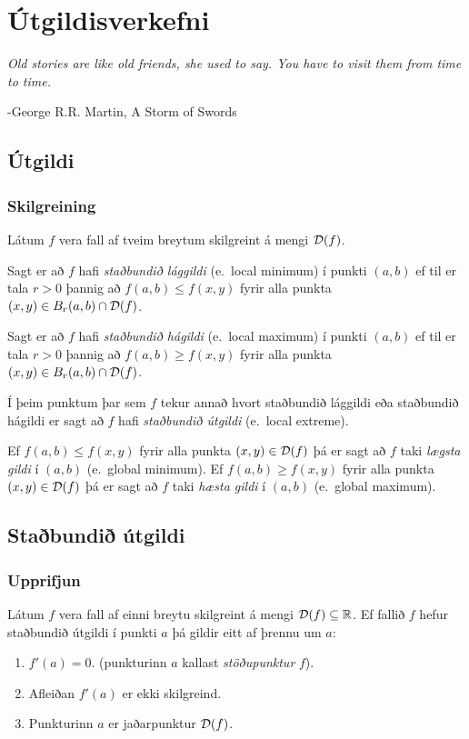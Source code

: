 \documentclass[a4paper,10pt,icelandic]{sphinxmanual}
\begin{document}
\chapter{Útgildisverkefni}
\label{Kafli3::doc}\label{Kafli3:utgildisverkefni}
\emph{Old stories are like old friends, she used to say. You have to visit them from time to time.}

-George R.R. Martin, A Storm of Swords


\section{Útgildi}
\label{Kafli3:utgildi}

\subsection{Skilgreining}
\label{Kafli3:skilgreining}
Látum \(f\) vera fall af tveim breytum skilgreint á mengi
\({\cal D}(f)\).

Sagt er að \(f\) hafi \emph{staðbundið lággildi} (e. local minimum) í
punkti \((a,b)\) ef til er tala \(r>0\) þannig að
\(f(a,b)\leq f(x,y)\) fyrir alla punkta
\((x,y)\in B_r(a,b)\cap{\cal D}(f)\).

Sagt er að \(f\) hafi \emph{staðbundið hágildi} (e. local maximum) í
punkti \((a,b)\) ef til er tala \(r>0\) þannig að
\(f(a,b)\geq f(x,y)\) fyrir alla punkta
\((x,y)\in B_r(a,b)\cap{\cal D}(f)\).

Í þeim punktum þar sem \(f\) tekur annað hvort staðbundið lággildi
eða staðbundið hágildi er sagt að \(f\) hafi \emph{staðbundið útgildi}
(e. local extreme).

Ef \(f(a,b)\leq f(x,y)\) fyrir alla punkta
\((x,y)\in {\cal D}(f)\) þá er sagt að \(f\) taki \emph{lægsta gildi}
í \((a,b)\) (e. global minimum). Ef \(f(a,b)\geq f(x,y)\) fyrir
alla punkta \((x,y)\in {\cal D}(f)\) þá er sagt að \(f\) taki
\emph{hæsta gildi} í \((a,b)\) (e. global maximum).


\section{Staðbundið útgildi}
\label{Kafli3:stabundi-utgildi}

\subsection{Upprifjun}
\label{Kafli3:upprifjun}
Látum \(f\) vera fall af einni breytu skilgreint á mengi
\({\cal D}(f)\subseteq {\mathbb  R}\). Ef fallið \(f\) hefur
staðbundið útgildi í punkti \(a\) þá gildir eitt af þrennu um
\(a\):
\begin{enumerate}
\item {} 
\(f'(a)=0\). (punkturinn \(a\) kallast \emph{stöðupunktur}
\(f\)).

\item {} 
Afleiðan \(f'(a)\) er ekki skilgreind.

\item {} 
Punkturinn \(a\) er jaðarpunktur \({\cal D}(f)\).

\end{enumerate}
\end{document}
